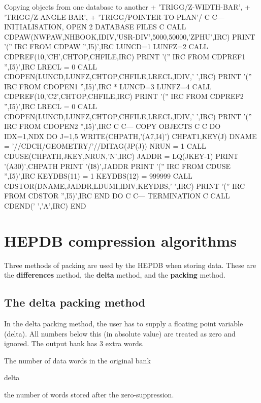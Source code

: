 \begin{XMPt}{Copying objects from one database to another}
     +            'TRIGG/Z-WIDTH-BAR',
     +            'TRIGG/Z-ANGLE-BAR',
     +            'TRIGG/POINTER-TO-PLAN'/
C
C---      INITIALISATION, OPEN 2 DATABASE FILES
C
      CALL CDPAW(NWPAW,NHBOOK,IDIV,'USR-DIV',5000,50000,'ZPHU',IRC)
      PRINT '('' IRC FROM CDPAW '',I5)',IRC
      LUNCD=1
      LUNFZ=2
      CALL CDPREF(10,'CH',CHTOP,CHFILE,IRC)
      PRINT '('' IRC FROM CDPREF1 '',I5)',IRC
      LRECL = 0
      CALL CDOPEN(LUNCD,LUNFZ,CHTOP,CHFILE,LRECL,IDIV,' ',IRC)
      PRINT '('' IRC FROM CDOPEN1 '',I5)',IRC
*
      LUNCD=3
      LUNFZ=4
      CALL CDPREF(10,'C2',CHTOP,CHFILE,IRC)
      PRINT '('' IRC FROM CDPREF2 '',I5)',IRC
      LRECL = 0
      CALL CDOPEN(LUNCD,LUNFZ,CHTOP,CHFILE,LRECL,IDIV,' ',IRC)
      PRINT '('' IRC FROM CDOPEN2 '',I5)',IRC
C
C---  COPY OBJECTS
C
C     DO IDX=1,NDX
      DO J=1,5
          WRITE(CHPATH,'(A7,I4)') CHPAT1,KEY(J)
          DNAME = '//CDCH/GEOMETRY/'//DITAG(JP(J))
          NRUN = 1
          CALL CDUSE(CHPATH,JKEY,NRUN,'N',IRC)
          JADDR = LQ(JKEY-1)
          PRINT '(A30)',CHPATH
          PRINT '(I8)',JADDR
          PRINT '('' IRC FROM CDUSE '',I5)',IRC
          KEYDBS(11) = 1
          KEYDBS(12) = 999999
          CALL CDSTOR(DNAME,JADDR,LDUMI,IDIV,KEYDBS,' ',IRC)
          PRINT '('' IRC FROM CDSTOR '',I5)',IRC
      END DO
C
C--- TERMINATION
C
      CALL CDEND(' ','A',IRC)
      END
\end{XMPt}

\chapter{HEPDB compression algorithms}

Three methods of packing are used by the HEPDB when storing data.
These are the {\bf differences} method,
the {\bf delta} method, and the {\bf packing} method.

\section{The delta packing method}

In the delta packing method, the user has to supply a
floating point variable (delta). All numbers below this (in absolute
value) are treated as zero and ignored.
The output bank has 3 extra words.

\begin{OL}
\item The number of data words in the original bank
\item delta
\item the number of words stored after the zero-suppression.
\end{OL}

